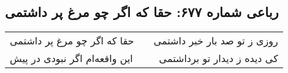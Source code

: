 \begin{center}
\section*{رباعی شماره ۶۷۷: حقا که اگر چو مرغ پر داشتمی}
\label{sec:sh677}
\begin{longtable}{l p{0.5cm} r}
حقا که اگر چو مرغ پر داشتمی
&&
روزی ز تو صد بار خبر داشتمی
\\
این واقعه‌ام اگر نبودی در پیش
&&
کی دیده ز دیدار تو برداشتمی
\\
\end{longtable}
\end{center}
